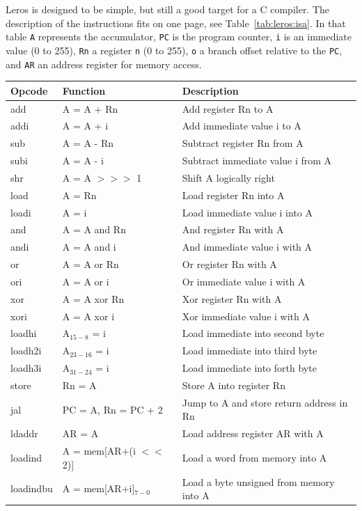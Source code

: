\documentclass[%
    10pt,
    headinclude, footexclude,
    openright, %
    notitlepage,
    cleardoubleempty,
    headsepline,
    pointlessnumbers,
    bibtotoc, idxtotoc,
    ]{scrbook}
\newcommand{\code}[1]{{\small{\texttt{#1}}}}
\begin{document}
Leros is designed to be simple, but still a good target for a C compiler.
The description of the instructions fits on one page, see Table~\ref{tab:leros:isa}.
In that table \code{A} represents the accumulator, \code{PC} is the program counter,
\code{i} is an immediate value (0 to 255), \code{Rn} a register
\code{n} (0 to 255), \code{o} a branch offset relative to the \code{PC},
and \code{AR} an address register for memory access.

\begin{table}
\centering
\begin{tabular}{lll}
\toprule
Opcode & Function & Description\\
\midrule
add & A = A + Rn & Add register Rn to A \\
addi & A = A + i & Add immediate value i to A \\
sub & A = A - Rn & Subtract register Rn from A \\
subi & A = A - i & Subtract immediate value i from A \\
shr & A = A $>>>$ 1 & Shift A logically right \\
load & A = Rn & Load register Rn into A \\
loadi & A = i & Load immediate value i into A \\
and & A = A and Rn & And register Rn with A \\
andi & A = A and i & And immediate value i with A \\
or & A = A or Rn & Or register Rn with A \\
ori & A = A or i & Or immediate value i with A \\
xor & A = A xor Rn & Xor register Rn with A \\
xori & A = A xor i & Xor immediate value i with A \\
loadhi & A$_{15-8}$ = i & Load immediate into second byte \\
loadh2i & A$_{23-16}$ = i  & Load immediate into third byte \\
loadh3i & A$_{31-24}$ = i & Load immediate into forth byte \\
store & Rn = A & Store A into register Rn \\
jal & PC = A, Rn = PC + 2 & Jump to A and store return address in Rn \\
ldaddr & AR = A & Load address register AR with A \\
loadind & A = mem[AR+(i $<<$ 2)] & Load a word from memory into A \\
loadindbu & A = mem[AR+i]$_{7-0}$  &  Load a byte unsigned from memory into A\\

\end{tabular}
\end{table}
\end{document}
